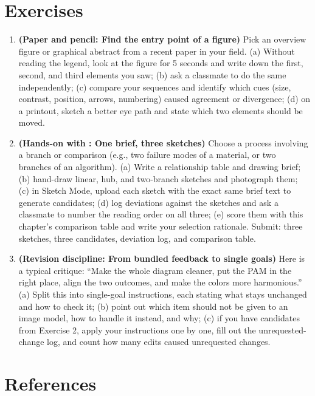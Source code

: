\section{Exercises}

\begin{enumerate}
\item \textbf{(Paper and pencil: Find the entry point of a figure)} Pick an overview figure or graphical abstract from a recent paper in your field. (a) Without reading the legend, look at the figure for 5 seconds and write down the first, second, and third elements you saw; (b) ask a classmate to do the same independently; (c) compare your sequences and identify which cues (size, contrast, position, arrows, numbering) caused agreement or divergence; (d) on a printout, sketch a better eye path and state which two elements should be moved.
\item \textbf{(Hands-on with \scidraw{}: One brief, three sketches)} Choose a process involving a branch or comparison (e.g., two failure modes of a material, or two branches of an algorithm). (a) Write a relationship table and drawing brief; (b) hand-draw linear, hub, and two-branch sketches and photograph them; (c) in \scidraw{} Sketch Mode, upload each sketch with the exact same brief text to generate candidates; (d) log deviations against the sketches and ask a classmate to number the reading order on all three; (e) score them with this chapter's comparison table and write your selection rationale. Submit: three sketches, three candidates, deviation log, and comparison table.
\item \textbf{(Revision discipline: From bundled feedback to single goals)} Here is a typical critique: ``Make the whole diagram cleaner, put the PAM in the right place, align the two outcomes, and make the colors more harmonious.'' (a) Split this into single-goal instructions, each stating what stays unchanged and how to check it; (b) point out which item should not be given to an image model, how to handle it instead, and why; (c) if you have candidates from Exercise 2, apply your instructions one by one, fill out the unrequested-change log, and count how many edits caused unrequested changes.
\end{enumerate}

\section*{References}

